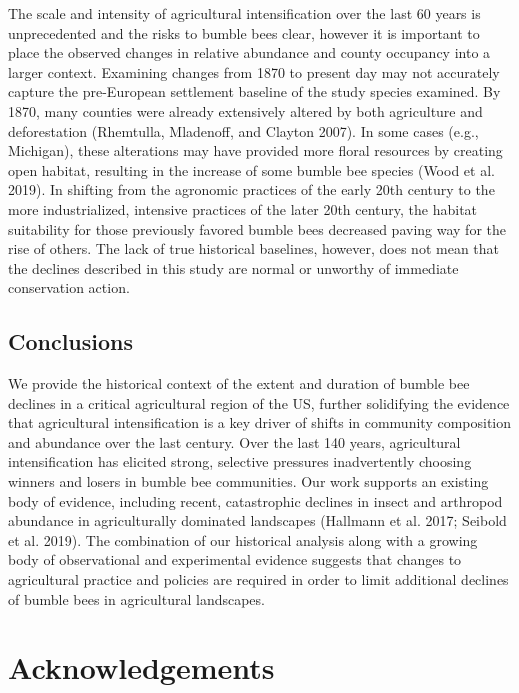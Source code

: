 \documentclass[11pt,]{article}
\begin{document}
The scale and intensity of agricultural intensification over the last 60
years is unprecedented and the risks to bumble bees clear, however it is
important to place the observed changes in relative abundance and county
occupancy into a larger context. Examining changes from 1870 to present
day may not accurately capture the pre-European settlement baseline of
the study species examined. By 1870, many counties were already
extensively altered by both agriculture and deforestation (Rhemtulla,
Mladenoff, and Clayton 2007). In some cases (e.g., Michigan), these
alterations may have provided more floral resources by creating open
habitat, resulting in the increase of some bumble bee species (Wood et
al. 2019). In shifting from the agronomic practices of the early 20th
century to the more industrialized, intensive practices of the later
20th century, the habitat suitability for those previously favored
bumble bees decreased paving way for the rise of others. The lack of
true historical baselines, however, does not mean that the declines
described in this study are normal or unworthy of immediate conservation
action.

\hypertarget{conclusions}{%
\subsection{Conclusions}\label{conclusions}}

We provide the historical context of the extent and duration of bumble
bee declines in a critical agricultural region of the US, further
solidifying the evidence that agricultural intensification is a key
driver of shifts in community composition and abundance over the last
century. Over the last 140 years, agricultural intensification has
elicited strong, selective pressures inadvertently choosing winners and
losers in bumble bee communities. Our work supports an existing body of
evidence, including recent, catastrophic declines in insect and
arthropod abundance in agriculturally dominated landscapes (Hallmann et
al. 2017; Seibold et al. 2019). The combination of our historical
analysis along with a growing body of observational and experimental
evidence suggests that changes to agricultural practice and policies are
required in order to limit additional declines of bumble bees in
agricultural landscapes.

\hypertarget{acknowledgements}{%
\section{Acknowledgements}\label{acknowledgements}}
\end{document}
